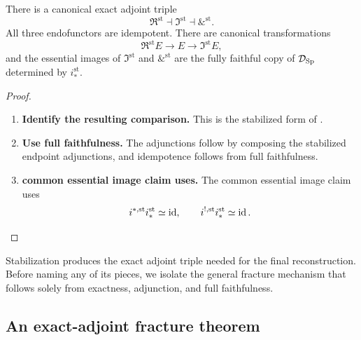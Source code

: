 \begin{proposition}
\label{prop:stable-differential-cohesive-modal-triple}
There is a canonical exact adjoint triple
\[
    \Re^{\mathrm{st}}
    \dashv
    \Im^{\mathrm{st}}
    \dashv
    \&^{\mathrm{st}}.
\]
All three endofunctors are idempotent. There are canonical transformations
\[
    \Re^{\mathrm{st}}E\longrightarrow E\longrightarrow\Im^{\mathrm{st}}E,
\]
and the essential images of \(\Im^{\mathrm{st}}\) and
\(\&^{\mathrm{st}}\) are the fully faithful copy of
\(\mathcal D_{\operatorname{Sp}}\) determined by \(i_*^{\mathrm{st}}\).
\end{proposition}

\begin{proof}
\leavevmode
\begin{enumerate}[label=\textup{(\arabic*)}]
    \item \textbf{Identify the resulting comparison.}
    This is the stabilized form of .

    \item \textbf{Use full faithfulness.}
    The adjunctions follow by composing the stabilized endpoint adjunctions, and idempotence
    follows from full faithfulness.

    \item \textbf{common essential image claim uses.}
    The common essential image claim uses
    \[
        i^{*,\mathrm{st}}i_*^{\mathrm{st}}\simeq\operatorname{id},
        \qquad
        i^{!,\mathrm{st}}i_*^{\mathrm{st}}\simeq\operatorname{id}.
    \]
\end{enumerate}
\end{proof}
Stabilization produces the exact adjoint triple needed for the final
reconstruction. Before naming any of its pieces, we isolate the general
fracture mechanism that follows solely from exactness, adjunction, and full
faithfulness.

\subsection{An exact-adjoint fracture theorem}

